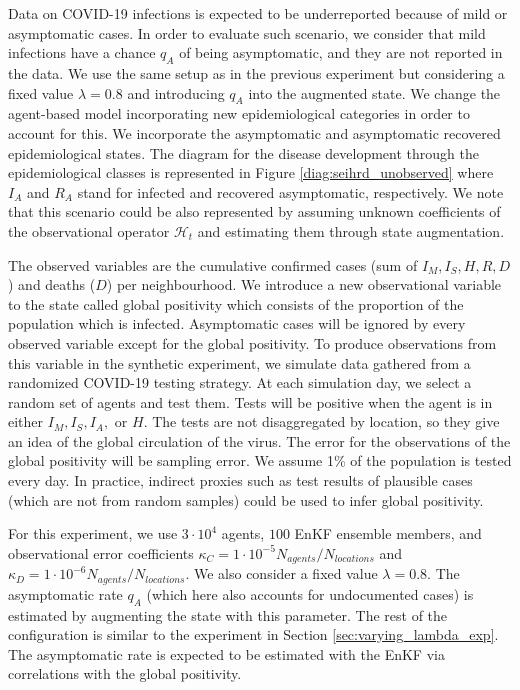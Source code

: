\documentclass[11pt,a4paper]{article}
\begin{document}
Data on COVID-19 infections is expected to be underreported because of mild or asymptomatic cases. In order to evaluate such scenario, we consider that mild infections have a chance $q_A$ of being asymptomatic, and they are not reported in the data. We use the same setup as in the previous experiment but considering a fixed value $\lambda = 0.8$ and introducing $q_A$ into the augmented state. We change the agent-based model incorporating new epidemiological categories in order to account for this. We incorporate the asymptomatic and asymptomatic recovered epidemiological states. The diagram for the disease development through the epidemiological classes is represented in Figure \ref{diag:seihrd_unobserved} where $I_A$ and $R_A$ stand for infected and recovered asymptomatic, respectively. We note that this scenario could be also represented by assuming unknown coefficients of the observational operator $\mathcal H_t$ and estimating them through state augmentation.


The observed variables are the cumulative confirmed cases (sum of $I_M, I_S, H, R, D$) and deaths ($D$) per neighbourhood. We introduce a new observational variable to the state called global positivity which consists of the proportion of the population which is infected. Asymptomatic cases will be ignored by every observed variable except for the global positivity. To produce observations from this variable in the synthetic experiment,  we simulate data gathered from a randomized COVID-19 testing strategy. At each simulation day, we select a random set of agents and test them. Tests will be positive when the agent is in either $I_M, I_S, I_A,$ or $H$. The tests are not disaggregated by location, so they give an idea of the global circulation of the virus. The error for the observations of the global positivity will be sampling error. We assume 1\% of the population is tested every day. In practice, indirect proxies such as test results of plausible cases (which are not from random samples) could be used to infer global positivity.

For this experiment, we use $3\cdot 10^4$ agents, $100$ EnKF ensemble members, and observational error coefficients $\kappa_{C} = 1 \cdot 10^{-5} N_{agents}/N_{locations}$ and $\kappa_{D} = 1 \cdot 10^{-6} N_{agents}/N_{locations}$. We also consider a fixed value $\lambda = 0.8$. The asymptomatic rate $q_A$ (which here also accounts for undocumented cases) is estimated by augmenting  the state with this parameter. The rest of the configuration is similar to the experiment in Section \ref{sec:varying_lambda_exp}. The asymptomatic rate is expected to be estimated with the EnKF via correlations with the global positivity.
\end{document}
